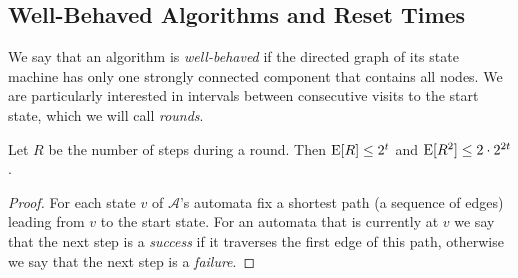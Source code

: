 \documentclass{patmorin}
\begin{document}
\subsection{Well-Behaved Algorithms and Reset Times}

We say that an algorithm is \emph{well-behaved} if the directed graph
of its state machine has only one strongly connected component that
contains all nodes.  We are particularly interested in intervals
between consecutive visits to the start state, which we will call
\emph{rounds}.

\begin{lem}
Let $R$ be the number of steps during a round. Then 
$\mathrm{E}[R] \le 2^t$ and $\mathrm{E}[R^2] \le 2\cdot2^{2t}$.
\end{lem}

\begin{proof}
For each state $v$ of $\mathcal{A}$'s automata fix a shortest path (a
sequence of edges) leading from $v$ to the start state.  For an
automata that is currently at $v$ we say that the next step is a
\emph{success} if it traverses the first edge of this path, otherwise
we say that the next step is a \emph{failure}.


\end{proof}
\end{document}
